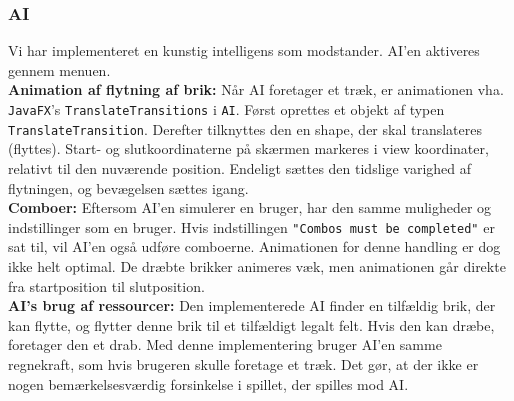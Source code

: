 \subsubsection{AI}

Vi har implementeret en kunstig intelligens som modstander. AI'en aktiveres gennem menuen. \\

\textbf{Animation af flytning af brik:} Når AI foretager et træk, er animationen vha. \texttt{JavaFX}'s \texttt{TranslateTransitions} i \texttt{AI}. Først oprettes et objekt af typen \texttt{TranslateTransition}. Derefter tilknyttes den en shape, der skal translateres (flyttes). Start- og slutkoordinaterne på skærmen markeres i view koordinater, relativt til den nuværende position. Endeligt sættes den tidslige varighed af flytningen, og bevægelsen sættes igang. \\

\textbf{Comboer:} 
Eftersom AI'en simulerer en bruger, har den samme muligheder og indstillinger som en bruger. Hvis indstillingen \texttt{"Combos must be completed"} er sat til, vil AI'en også udføre comboerne. Animationen for denne handling er dog ikke helt optimal. De dræbte brikker animeres væk, men animationen går direkte fra startposition til slutposition. \\

\textbf{AI's brug af ressourcer:} Den implementerede AI finder en tilfældig brik, der kan flytte, og flytter denne brik til et tilfældigt legalt felt. Hvis den kan dræbe, foretager den et drab. Med denne implementering bruger AI'en samme regnekraft, som hvis brugeren skulle foretage et træk. Det gør, at der ikke er nogen bemærkelsesværdig forsinkelse i spillet, der spilles mod AI.